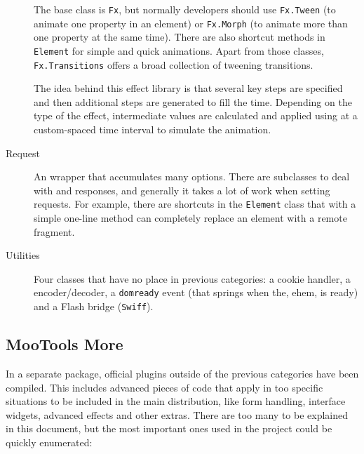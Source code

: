 \begin{description}
  The base class is \texttt{Fx}, but normally developers should use \texttt{Fx.Tween} (to animate one property in an element) or \texttt{Fx.Morph} (to animate more than one property at the same time).
  There are also shortcut methods in \texttt{Element} for simple and quick animations.
  Apart from those classes, \texttt{Fx.Transitions} offers a broad collection of tweening transitions.
  
  The idea behind this effect library is that several key steps are specified and then additional steps are generated to fill the time.
  Depending on the type of the effect, intermediate values are calculated and applied using  at a custom-spaced time interval to simulate the animation.
  \item[Request] An  wrapper that accumulates many options.
  There are subclasses to deal with  and  responses, and generally it takes a lot of work when setting  requests.
  For example, there are shortcuts in the \texttt{Element} class that with a simple one-line method can completely replace an element with a remote fragment.
  \item[Utilities] Four classes that have no place in previous categories: a cookie handler, a  encoder/decoder, a \texttt{domready} event (that springs when the, ehem,  is ready) and a Flash bridge (\texttt{Swiff}).
\end{description}


\subsection{MooTools More} %
\label{sub:mootools_more}

In a separate package, official plugins outside of the previous categories have been compiled.
This includes advanced pieces of code that apply in too specific situations to be included in the main distribution, like form handling, interface widgets, advanced effects and other extras.
There are too many to be explained in this document, but the most important ones used in the project could be quickly enumerated:

